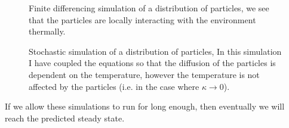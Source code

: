 \documentclass[11pt]{article} %
\begin{document}
\begin{figure}[tb]
	\centering
\quad
\caption{Finite differencing simulation of a distribution of particles, we see that the particles are locally interacting with the environment thermally.}
\label{fig:FiniteDifferences} 
\end{figure}

\begin{figure}[tb]
	\centering
\quad
\caption{Stochastic simulation of a distribution of particles, In this simulation I have coupled the equations so that the diffusion of the particles is dependent on the temperature, however the temperature is not affected by the particles (i.e. in the case where
 $\kappa \to 0$).}
\label{fig:Stochastic} 
\end{figure}

If we allow these simulations to run for long enough, then eventually we will reach the predicted steady state.







\clearpage{}   %
{} %


\end{document}
